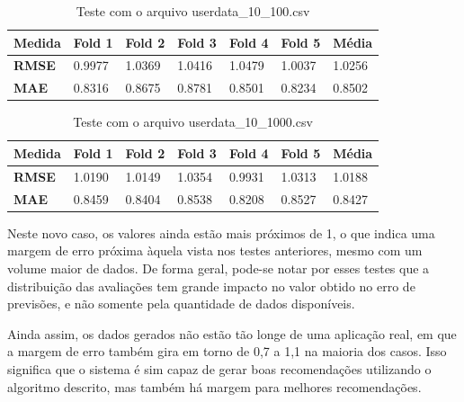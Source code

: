 \documentclass[
	12pt,				%
	oneside,			%
	a4paper,			%
	chapter=TITLE,		%
	english,			%
	french,				%
	spanish,			%
	brazil				%
	]{abntex2}
\begin{document}
\begin{table}[ht]
    \centering
    \ABNTEXchapterfont
    \caption{Teste com o arquivo userdata\_10\_100.csv}
    \begin{tabular}{|m{1.5cm}|m{1.5cm}|m{1.5cm}|m{1.5cm}|m{1.5cm}|m{1.5cm}|m{1.5cm}|}
    \hline
        \textbf{Medida}& \textbf{Fold 1} & \textbf{Fold 2} & \textbf{Fold 3} & \textbf{Fold 4}& \textbf{Fold 5} & \textbf{Média}\\
        \hline
        \hline
        \textbf{RMSE} & 0.9977 & 1.0369 & 1.0416 & 1.0479 & 1.0037 & 1.0256\\ 
        \hline
        \textbf{MAE} & 0.8316 & 0.8675 & 0.8781 & 0.8501 & 0.8234 & 0.8502\\
        \hline
    \end{tabular}
    \label{tab:teste5}
\end{table}

\begin{table}[ht]
    \centering
    \ABNTEXchapterfont
    \caption{Teste com o arquivo userdata\_10\_1000.csv}
    \begin{tabular}{|m{1.5cm}|m{1.5cm}|m{1.5cm}|m{1.5cm}|m{1.5cm}|m{1.5cm}|m{1.5cm}|}
    \hline
        \textbf{Medida}& \textbf{Fold 1} & \textbf{Fold 2} & \textbf{Fold 3} & \textbf{Fold 4}& \textbf{Fold 5} & \textbf{Média}\\
        \hline
        \hline
        \textbf{RMSE} & 1.0190 & 1.0149 & 1.0354 & 0.9931 & 1.0313 & 1.0188 \\ 
        \hline
        \textbf{MAE} & 0.8459 & 0.8404 & 0.8538 & 0.8208 & 0.8527 & 0.8427\\
        \hline
    \end{tabular}
    \label{tab:teste6}
\end{table}

Neste novo caso, os valores ainda estão mais próximos de 1, o que indica uma margem de erro próxima àquela vista nos testes anteriores, mesmo com um volume maior de dados. De forma geral, pode-se notar por esses testes que a distribuição das avaliações tem grande impacto no valor obtido no erro de previsões, e não somente pela quantidade de dados disponíveis.

Ainda assim, os dados gerados não estão tão longe de uma aplicação real, em que a margem de erro também gira em torno de 0,7 a 1,1 na maioria dos casos. Isso significa que o sistema é sim capaz de gerar boas recomendações utilizando o algoritmo descrito, mas também há margem para melhores recomendações.
\end{document}
